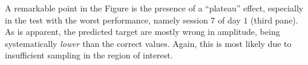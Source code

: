 A remarkable point in the Figure is the presence of a ``plateau''
effect, especially in the test with the worst performance, namely
session $7$ of day $1$ (third pane). As is apparent, the predicted
target are mostly wrong in amplitude, being systematically
\emph{lower} than the correct values. Again, this is most likely due
to insufficient sampling in the region of interest.
